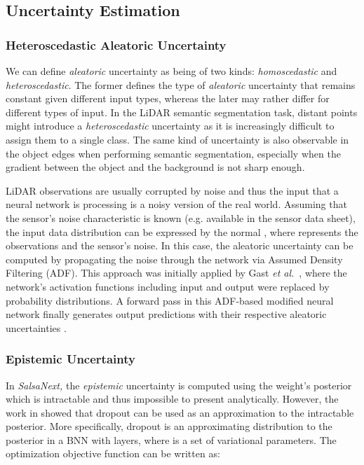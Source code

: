 \documentclass[letterpaper, 10 pt, conference]{ieeeconf}
\makeatletter
\newcommand{\snxk}[1]{\textit{SalsaNext, }{#1}}
\def\eg{e.g.\@\xspace}
\makeatother
\begin{document}
 





\subsection{Uncertainty Estimation}
\label{sec:uncertest}

\subsubsection{Heteroscedastic Aleatoric Uncertainty}
We can define \textit{aleatoric} uncertainty as being of two kinds: \textit{homoscedastic} and \textit{heteroscedastic}. The former defines the type of \textit{aleatoric} uncertainty that remains constant given different input types, whereas the later  may rather differ for different types of input. 
In the LiDAR semantic segmentation task, distant points might introduce a  \textit{heteroscedastic} uncertainty as it is increasingly difficult to assign them to a single class. The same kind of uncertainty is also observable in the object edges when performing semantic segmentation, especially when the gradient between the object and the background is not sharp enough.





LiDAR observations are usually corrupted by noise and thus the input that a neural network is processing is a noisy version of the real world. Assuming that the sensor's noise characteristic is known (\eg  available in the sensor data sheet), the input data distribution can be expressed by the normal , where  represents the observations and  the sensor's noise. In this case, the aleatoric uncertainty can be computed by propagating the noise through the network via Assumed Density Filtering (ADF). This approach was initially applied 
by Gast \textit{et al.}~\cite{gast2018lightweight}, where the network's activation functions including   input and   output were replaced by probability distributions. A forward pass in this ADF-based modified neural network finally generates output predictions   with their respective aleatoric   uncertainties .


\subsubsection{Epistemic Uncertainty}
In \snxk the \textit{epistemic} uncertainty is computed using the weight's posterior  which is intractable and thus impossible to present analytically. However, the work in \cite{gal2016dropout} showed that dropout can be used as an approximation to the intractable posterior. More specifically, dropout is an approximating distribution  to the posterior in a BNN with  layers,  where  is a set of variational parameters. The optimization objective function can be written as:
\end{document}
